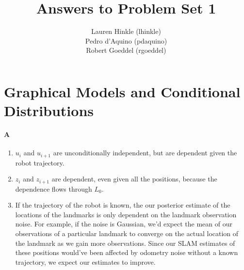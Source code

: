 \documentclass[12pt]{article}
\title{Answers to Problem Set 1}
\author{
	Lauren Hinkle (lhinkle)\\
	Pedro d'Aquino  (pdaquino)\\
	Robert Goeddel (rgoeddel)}
\begin{document}
\maketitle
\pagebreak

\section{Graphical Models and Conditional Distributions}

\paragraph{A}
\begin{enumerate}
	\item $u_i$ and $u_{i+1}$ are unconditionally independent, but are dependent given the robot trajectory.
	\item $z_i$ and $z_{i+1}$ are dependent, even given all the positions, because the dependence flows through $L_0$.
	\item If the trajectory of the robot is known, the our posterior estimate of the locations of the
    landmarks is only dependent on the landmark observation noise. For example, if the noise is Gaussian,
    we'd expect the mean of our observations of a particular landmark to converge on the actual location
    of the landmark as we gain more observations. Since our SLAM estimates of these positions would've
    been affected by odometry noise without a known trajectory, we expect our estimates to improve.
\end{enumerate}
\end{document}
